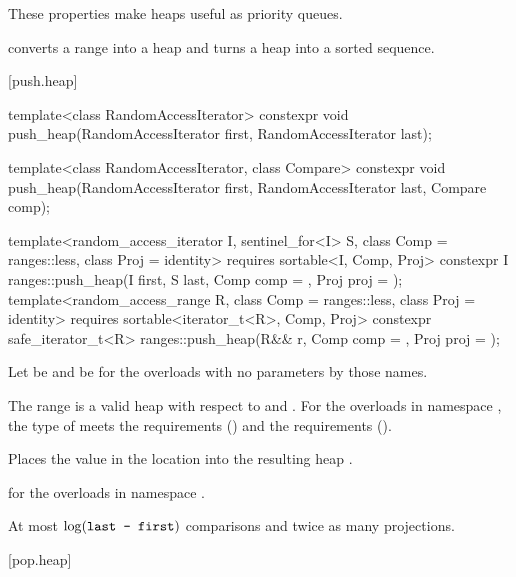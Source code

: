 \pnum
These properties make heaps useful as priority queues.

\pnum
{} converts a range into a heap and
 turns a heap into a sorted sequence.

[push.heap]{}

%
\begin{itemdecl}
template<class RandomAccessIterator>
  constexpr void push_heap(RandomAccessIterator first, RandomAccessIterator last);

template<class RandomAccessIterator, class Compare>
  constexpr void push_heap(RandomAccessIterator first, RandomAccessIterator last,
                           Compare comp);

template<random_access_iterator I, sentinel_for<I> S, class Comp = ranges::less,
         class Proj = identity>
  requires sortable<I, Comp, Proj>
  constexpr I
    ranges::push_heap(I first, S last, Comp comp = {}, Proj proj = {});
template<random_access_range R, class Comp = ranges::less, class Proj = identity>
  requires sortable<iterator_t<R>, Comp, Proj>
  constexpr safe_iterator_t<R>
    ranges::push_heap(R&& r, Comp comp = {}, Proj proj = {});
\end{itemdecl}

\begin{itemdescr}
\pnum
Let  be 
and  be 
for the overloads with no parameters by those names.

\pnum
\expects
The range 
is a valid heap with respect to  and .
For the overloads in namespace ,
the type of  meets
the  requirements () and
the  requirements ().

\pnum
\effects
Places the value in the location 
into the resulting heap .

\pnum
\returns
{} for the overloads in namespace .

\pnum
\complexity
At most $\log(\texttt{last - first})$ comparisons and twice as many projections.
\end{itemdescr}

[pop.heap]{}

